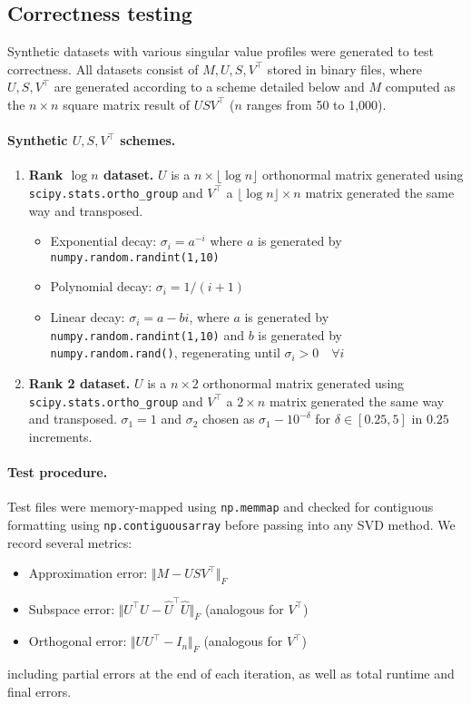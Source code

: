 \subsection{Correctness testing}
Synthetic datasets with various singular value profiles were generated to test correctness. All datasets consist of $M,U,S,V^\top$ stored in binary files, where $U,S,V^\top$ are generated according to a scheme detailed below and $M$ computed as the $n\times n$ square matrix result of $USV^\top$ ($n$ ranges from 50 to 1,000).

\paragraph{Synthetic $U,S,V^\top$ schemes.} 
\begin{enumerate}
    \item {\bf Rank $\log n$ dataset.} $U$ is a $n \times \lfloor\log n\rfloor$ orthonormal matrix generated using \texttt{scipy.stats.ortho\_group} and $V^\top$ a $\lfloor\log n\rfloor\times n$ matrix generated the same way and transposed. 
    \begin{itemize}
        \item Exponential decay: $\sigma_i = a^{-i}$ where $a$ is generated by \texttt{numpy.random.randint(1,10)}
        \item Polynomial decay: $\sigma_i = 1/({i+1})$
        \item Linear decay: $\sigma_i = a - bi$, where $a$ is generated by \texttt{numpy.random.randint(1,10)} and $b$ is generated by \texttt{numpy.random.rand()}, regenerating until $\sigma_i> 0 \quad\forall i$
    \end{itemize}
    \item {\bf Rank 2 dataset.} $U$ is a $n \times 2$ orthonormal matrix generated using \texttt{scipy.stats.ortho\_group} and $V^\top$ a $2\times n$ matrix generated the same way and transposed. $\sigma_1=1$ and $\sigma_2$ chosen as $\sigma_1 - 10^{-\delta}$ for $\delta\in[0.25,5]$ in $0.25$ increments.
\end{enumerate}

\paragraph{Test procedure.} Test files were memory-mapped using \texttt{np.memmap} and checked for contiguous formatting using \texttt{np.contiguousarray} before passing into any SVD method. We record several metrics:
\begin{itemize}
    \item Approximation error: $\Vert M-USV^\top\Vert_F$
    \item Subspace error: $\Vert U^\top U - \hat{U}^\top\hat{U}\Vert_F$ (analogous for $V^\top$)
    \item Orthogonal error: $\Vert U U^\top - I_n \Vert_F$ (analogous for $V^\top$)
\end{itemize}
including partial errors at the end of each iteration, as well as total runtime and final errors.

